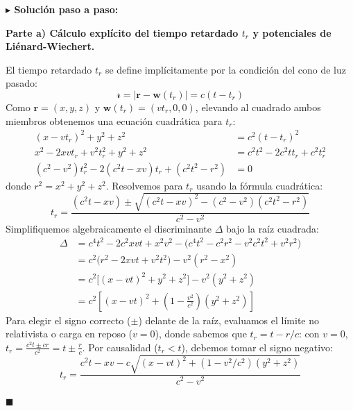 \documentclass[11pt,a4paper]{book}
\newenvironment{solucion}{%
    \par\medskip\noindent\textbf{\color{blue!65!black}\Large $\blacktriangleright$ Solución paso a paso:}\par\medskip
}{%
    \hfill$\blacksquare$\par\bigskip
}
\begin{document}
\begin{solucion}
\textbf{Parte a) Cálculo explícito del tiempo retardado $t_r$ y potenciales de Liénard-Wiechert.}

El tiempo retardado $t_r$ se define implícitamente por la condición del cono de luz pasado:
\begin{equation}
    \mathscr{r} = |\bm{r} - \bm{w}(t_r)| = c(t - t_r)
\end{equation}
Como $\bm{r} = (x,y,z)$ y $\bm{w}(t_r) = (vt_r, 0, 0)$, elevando al cuadrado ambos miembros obtenemos una ecuación cuadrática para $t_r$:
\begin{align}
    (x - vt_r)^2 + y^2 + z^2 &= c^2(t - t_r)^2 \\
    x^2 - 2xvt_r + v^2 t_r^2 + y^2 + z^2 &= c^2 t^2 - 2c^2 t t_r + c^2 t_r^2 \\
    (c^2 - v^2)t_r^2 - 2(c^2 t - xv)t_r + (c^2 t^2 - r^2) &= 0 \label{eq:cuad_tr}
\end{align}
donde $r^2 = x^2 + y^2 + z^2$. Resolvemos para $t_r$ usando la fórmula cuadrática:
\begin{equation}
    t_r = \frac{(c^2 t - xv) \pm \sqrt{(c^2 t - xv)^2 - (c^2 - v^2)(c^2 t^2 - r^2)}}{c^2 - v^2}
\end{equation}
Simplifiquemos algebraicamente el discriminante $\Delta$ bajo la raíz cuadrada:
\begin{align}
    \Delta &= c^4 t^2 - 2c^2 xvt + x^2 v^2 - \big(c^4 t^2 - c^2 r^2 - v^2 c^2 t^2 + v^2 r^2\big) \nonumber \\
    &= c^2\big(r^2 - 2xvt + v^2 t^2\big) - v^2(r^2 - x^2) \nonumber \\
    &= c^2\big[(x - vt)^2 + y^2 + z^2\big] - v^2(y^2 + z^2) \nonumber \\
    &= c^2\left[ (x - vt)^2 + \left(1 - \frac{v^2}{c^2}\right)(y^2 + z^2) \right]
\end{align}
Para elegir el signo correcto ($\pm$) delante de la raíz, evaluamos el límite no relativista o carga en reposo ($v = 0$), donde sabemos que $t_r = t - r/c$: con $v=0$, $t_r = \frac{c^2 t \pm c r}{c^2} = t \pm \frac{r}{c}$. Por causalidad ($t_r < t$), debemos tomar el signo negativo:
\begin{equation}
    t_r = \frac{c^2 t - xv - c\sqrt{(x - vt)^2 + (1 - v^2/c^2)(y^2 + z^2)}}{c^2 - v^2}
\end{equation}


\end{solucion}
\end{document}
